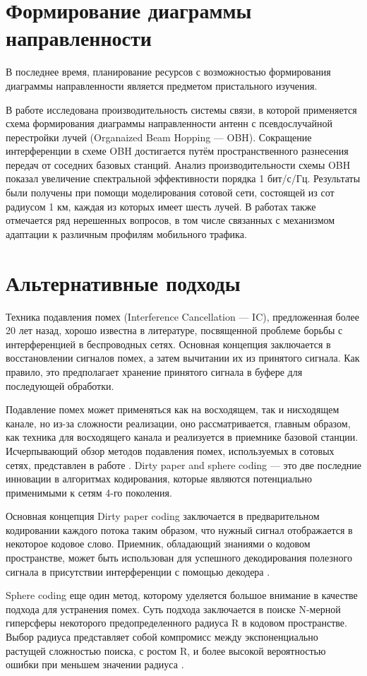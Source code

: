 \section{Формирование диаграммы направленности} \label{sect4_3}
В последнее время, планирование ресурсов с возможностью формирования диаграммы направленности \cite{svedman2007opportunistic} является предметом пристального изучения.

В работе \cite{hu2008radio} исследована производительность системы связи, в которой применяется схема формирования диаграммы направленности антенн с псевдослучайной перестройки лучей (Organaized Beam Hopping — OBH). Сокращение интерференции в схеме OBH достигается путём пространственного разнесения передач от соседних базовых станций. Анализ производительности схемы OBH показал увеличение спектральной эффективности порядка 1 бит/с/Гц. Результаты были получены при помощи моделирования сотовой сети, состоящей из сот радиусом 1 км, каждая из которых имеет шесть лучей. В работах также отмечается ряд нерешенных вопросов, в том числе связанных с механизмом адаптации к различным профилям мобильного трафика.


\section{Альтернативные подходы} \label{sect4_4}
Техника подавления помех (Interference Cancellation — IC), предложенная более 20 лет назад, хорошо известна в литературе, посвященной проблеме борьбы с интерференцией в беспроводных сетях. Основная концепция заключается в восстановлении сигналов помех, а затем вычитании их из принятого сигнала. Как правило, это предполагает хранение принятого сигнала в буфере для последующей обработки.

Подавление помех может применяться как на восходящем, так и нисходящем канале, но из-за сложности реализации, оно рассматривается, главным образом, как техника для восходящего канала и реализуется в приемнике базовой станции. Исчерпывающий обзор методов подавления помех, используемых в сотовых сетях, представлен в работе \cite{andrews2005interference}.
Dirty paper and sphere coding — это две последние инновации в алгоритмах кодирования, которые являются потенциально применимыми к сетям 4-го поколения.

Основная концепция Dirty paper coding заключается в предварительном кодировании каждого потока таким образом, что нужный сигнал отображается в некоторое кодовое слово. Приемник, обладающий знаниями о кодовом пространстве, может быть использован для успешного декодирования полезного сигнала в присутствии интерференции с помощью декодера \cite{choi2006capacity}.

Sphere coding еще один метод, которому уделяется большое внимание в качестве подхода для устранения помех. Суть подхода заключается в поиске N-мерной гиперсферы некоторого предопределенного радиуса R в кодовом пространстве. Выбор радиуса представляет собой компромисс между экспоненциально растущей сложностью поиска, с ростом R, и более высокой вероятностью ошибки при меньшем значении радиуса \cite{barbero2007performance}.


